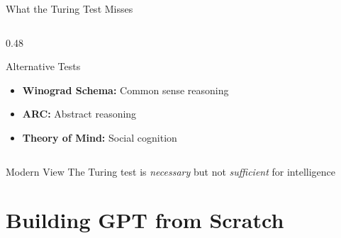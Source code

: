 \documentclass[aspectratio=169]{beamer}
\begin{document}
\begin{frame}{What the Turing Test Misses 🎯}
\begin{columns}[T]
\begin{column}{0.48\textwidth}
\vspace{0.5em}

\begin{exampleblock}{Alternative Tests}
\begin{itemize}
    \item \textbf{Winograd Schema:} Common sense reasoning
    \item \textbf{ARC:} Abstract reasoning
    \item \textbf{Theory of Mind:} Social cognition
\end{itemize}
\end{exampleblock}
\end{column}
\end{columns}

\vspace{0.5em}

\begin{alertblock}{Modern View}
The Turing test is \textit{necessary} but not \textit{sufficient} for intelligence
\end{alertblock}
\end{frame}

\section{Building GPT from Scratch}
\end{document}

